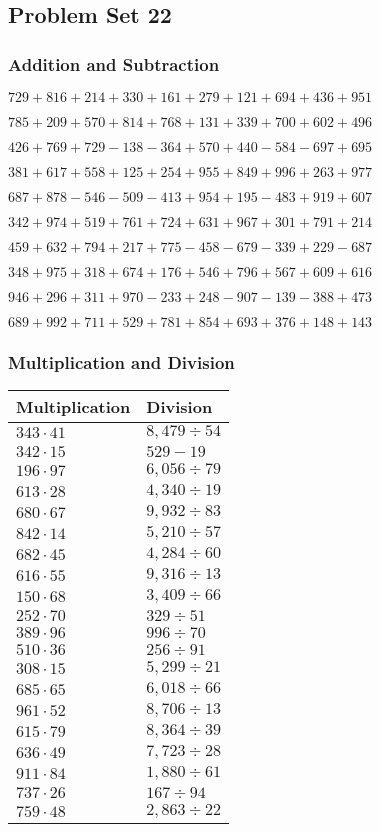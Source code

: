 \hypertarget{problem-set-22-2}{%
\subsection{Problem Set 22}\label{problem-set-22-2}}

\hypertarget{addition-and-subtraction-122}{%
\subsubsection{Addition and
Subtraction}\label{addition-and-subtraction-122}}

\(729 + 816 + 214 + 330 + 161 + 279 + 121 + 694 + 436 + 951\)

\(785 + 209 + 570 + 814 + 768 + 131 + 339 + 700 + 602 + 496\)

\(426 + 769 + 729 - 138 - 364 + 570 + 440 - 584 - 697 + 695\)

\(381 + 617 + 558 + 125 + 254 + 955 + 849 + 996 + 263 + 977\)

\(687 + 878 - 546 - 509 - 413 + 954 + 195 - 483 + 919 + 607\)

\(342 + 974 + 519 + 761 + 724 + 631 + 967 + 301 + 791 + 214\)

\(459 + 632 + 794 + 217 + 775 - 458 - 679 - 339 + 229 - 687\)

\(348 + 975 + 318 + 674 + 176 + 546 + 796 + 567 + 609 + 616\)

\(946 + 296 + 311 + 970 - 233 + 248 - 907 - 139 - 388 + 473\)

\(689 + 992 + 711 + 529 + 781 + 854 + 693 + 376 + 148 + 143\)

\hypertarget{multiplication-and-division-122}{%
\subsubsection{Multiplication and
Division}\label{multiplication-and-division-122}}

\begin{longtable}[]{@{}ll@{}}
\toprule
Multiplication & Division\tabularnewline
\midrule
\endhead
\(343 \cdot 41\) & \(8,479÷54\)\tabularnewline
\(342 \cdot 15\) & \(529 - 19\)\tabularnewline
\(196 \cdot 97\) & \(6,056÷79\)\tabularnewline
\(613 \cdot 28\) & \(4,340÷19\)\tabularnewline
\(680 \cdot 67\) & \(9,932÷83\)\tabularnewline
\(842 \cdot 14\) & \(5,210÷57\)\tabularnewline
\(682 \cdot 45\) & \(4,284÷60\)\tabularnewline
\(616 \cdot 55\) & \(9,316÷13\)\tabularnewline
\(150 \cdot 68\) & \(3,409÷66\)\tabularnewline
\(252 \cdot 70\) & \(329÷51\)\tabularnewline
\(389 \cdot 96\) & \(996÷70\)\tabularnewline
\(510 \cdot 36\) & \(256÷91\)\tabularnewline
\(308 \cdot 15\) & \(5,299÷21\)\tabularnewline
\(685 \cdot 65\) & \(6,018÷66\)\tabularnewline
\(961 \cdot 52\) & \(8,706÷13\)\tabularnewline
\(615 \cdot 79\) & \(8,364÷39\)\tabularnewline
\(636 \cdot 49\) & \(7,723÷28\)\tabularnewline
\(911 \cdot 84\) & \(1,880÷61\)\tabularnewline
\(737 \cdot 26\) & \(167÷94\)\tabularnewline
\(759 \cdot 48\) & \(2,863÷22\)\tabularnewline
\bottomrule
\end{longtable}

